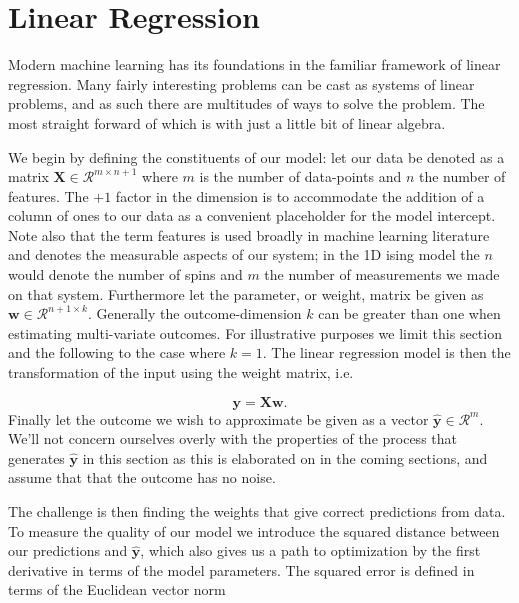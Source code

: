 
\section{Linear Regression}\label{sec:LinReg}

Modern machine learning has its foundations in the familiar framework of linear regression. Many fairly interesting problems can be cast as systems of linear problems, and as such there are multitudes of ways to solve the problem. The most straight forward of which is with just a little bit of linear algebra.

We begin by defining the constituents of our model: let our data be denoted as a matrix $\mathbf{X} \in \mathcal{R}^{m\times n+1}$ where $m$ is the number of data-points and $n$ the number of features. The $+1$ factor in the dimension is to accommodate the addition of a column of ones to our data as a convenient placeholder for the model intercept. Note also that the term features is used broadly in machine learning literature and denotes the measurable aspects of our system; in the 1D ising model the $n$ would denote the number of spins and $m$ the number of measurements we made on that system. Furthermore let the parameter, or weight, matrix be given as $\mathbf{w} \in \mathcal{R}^{n + 1\times k}$. Generally the outcome-dimension $k$ can be greater than one when estimating multi-variate outcomes. For illustrative purposes we limit this section and the following to the case where $k=1$. The linear regression model is then the transformation of the input using the weight matrix, i.e. 

\begin{equation}\label{eq:og_linreg}
\mathbf{y} = \mathbf{X}\mathbf{w}.
\end{equation}
\noindent Finally let the outcome we wish to approximate be given as a vector $\mathbf{\hat{y}} \in \mathcal{R}^m$. We'll not concern ourselves overly with the properties of the process that generates $\mathbf{\hat{y}}$ in this section as this is elaborated on in the coming sections, and assume that that the outcome has no noise.

The challenge is then finding the weights that give correct predictions from data. To measure the quality of our model we introduce the squared distance between our predictions and $\mathbf{\hat{y}}$, which also gives us a path to optimization by the first derivative in terms of the model parameters. The squared error is defined in terms of the Euclidean vector norm  

